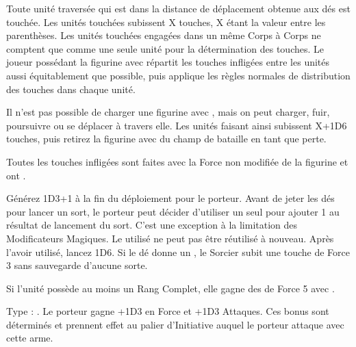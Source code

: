 Toute unité traversée qui est dans la distance de déplacement obtenue aux dés est touchée. Les unités touchées subissent X touches, X étant la valeur entre les parenthèses. Les unités touchées engagées dans un même Corps à Corps ne comptent que comme une seule unité pour la détermination des touches. Le joueur possédant la figurine avec \ricochet{} répartit les touches infligées entre les unités aussi équitablement que possible, puis applique les règles normales de distribution des touches dans chaque unité.

Il n'est pas possible de charger une figurine avec \ricochet{}, mais on peut charger, fuir, poursuivre ou se déplacer à travers elle. Les unités faisant ainsi subissent X+1D6 touches, puis retirez la figurine avec \ricochet{} du champ de bataille en tant que perte.

Toutes les touches infligées sont faites avec la Force non modifiée de la figurine et ont .


\closearmyspecialrules


\vspace{1.5cm}
\startarmyarmoury

\startitemlistonecol

\listitemonecol{\powershrooms} Générez 1D3+1 \powershrooms{} à la fin du déploiement pour le porteur. Avant de jeter les dés pour lancer un sort, le porteur peut décider d'utiliser un seul \powershroom{} pour ajouter 1 au résultat de lancement du sort. C'est une exception à la limitation des Modificateurs Magiques. Le \powershroom{} utilisé ne peut pas être réutilisé à nouveau. Après l'avoir utilisé, lancez 1D6. Si le dé donne un , le Sorcier subit une touche de Force 3 sans sauvegarde d'aucune sorte.

\listitemonecol{\mammothstabber} Si l'unité possède au moins un Rang Complet, elle gagne des  de Force 5 avec \multiplewounds{\ordnance}{\largetarget}.

\enditemlistonecol

\closearmyarmoury




\startarmymagicalitems

\armymagicalweapons

\startpricelist

Type : \hw{}. Le porteur gagne +1D3 en Force et +1D3 Attaques. Ces bonus sont déterminés et prennent effet au palier d'Initiative auquel le porteur attaque avec cette arme.

